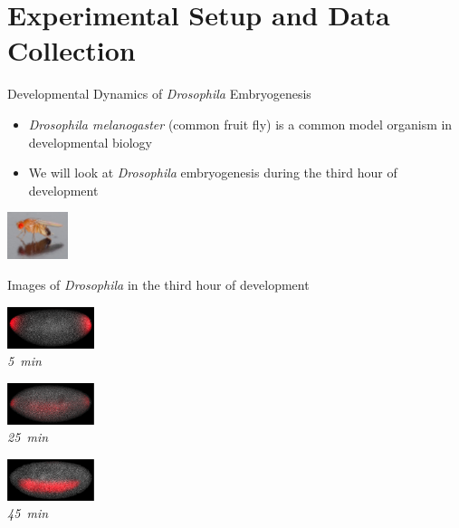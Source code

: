 \documentclass[10pt,aspectratio=169]{beamer}
\begin{document}
\section{Experimental Setup and Data Collection}

\begin{frame}{Developmental Dynamics of {\em Drosophila} Embryogenesis}

\begin{minipage}[b]{0.7\textwidth}
\vspace{0.2in}
\begin{itemize}
\item {\em Drosophila melanogaster} (common fruit fly) is a common model organism in developmental biology
\item We will look at {\em Drosophila} embryogenesis during the third hour of development
\end{itemize}
\end{minipage}
%
\hspace{0.2in}
\includegraphics[width=0.7in]{drosophila_picture}

\vspace{0.3in}

\begin{center}
Images of {\em Drosophila} in the third hour of development


\begin{minipage}{0.3\textwidth}
\centering
\includegraphics[width=1in]{longitudinal_5min}\\
{\em \scriptsize 5~min}
\end{minipage}
%
\begin{minipage}{0.3\textwidth}
\centering
\includegraphics[width=1in]{longitudinal_25min}\\
{\em \scriptsize 25~min}
\end{minipage}
%
\begin{minipage}{0.3\textwidth}
\centering
\includegraphics[width=1in]{longitudinal_45min}\\
{\em \scriptsize 45~min}
\end{minipage}


\end{center}
\end{frame}
\end{document}
